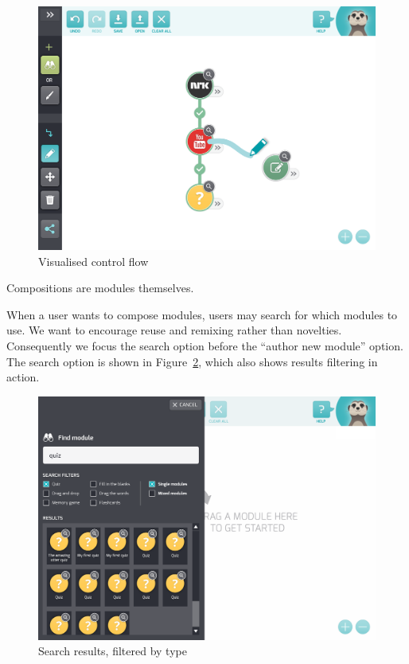 \begin{figure}[H]
    \centering
    \begin{scale}{0.1}
        \includegraphics{fig/arrows.png}
    \end{scale}
    \caption{Visualised control flow}
   \label{fig:arrows}
\end{figure}

Compositions are modules themselves.

When a user wants to compose modules, users may search for which modules to 
use. We want to encourage reuse and remixing rather than novelties. 
Consequently we focus the search option before the ``author new module'' 
option. The search option is shown in Figure~\ref{fig:search}, which also 
shows results filtering in action.

\begin{figure}[H]
    \centering
    \begin{scale}{0.1}
        \includegraphics{fig/search.png}
    \end{scale}
    \caption{Search results, filtered by type}
   \label{fig:search}
\end{figure}

